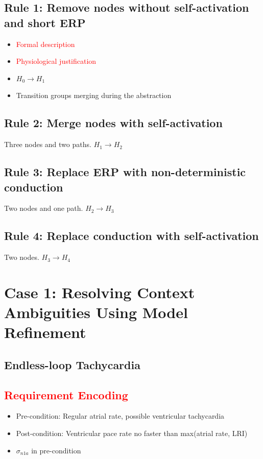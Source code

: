 \documentclass{llncs}
\begin{document}
  
\subsection{Rule 1: Remove nodes without self-activation and short ERP}
\begin{itemize}
	\item \textcolor{red}{Formal description}
    \item \textcolor{red}{Physiological justification}
    \item $H_0\rightarrow H_1$
    \item Transition groups merging during the abstraction
\end{itemize}

\subsection{Rule 2: Merge nodes with self-activation}
Three nodes and two paths. $H_1\rightarrow H_2$
\subsection{Rule 3: Replace ERP with non-deterministic conduction}
Two nodes and one path. $H_2\rightarrow H_3$
\subsection{Rule 4: Replace conduction with self-activation}
Two nodes. $H_3\rightarrow H_4$

\section{Case 1: Resolving Context Ambiguities Using Model Refinement}
\subsection{Endless-loop Tachycardia}
\subsection{\textcolor{red}{Requirement Encoding}}
\begin{itemize}
	\item Pre-condition: Regular atrial rate, possible ventricular tachycardia
    \item Post-condition: Ventricular pace rate no faster than max(atrial rate, LRI)
    \item $\sigma_{n1a}$ in pre-condition
\end{itemize}
\end{document}
